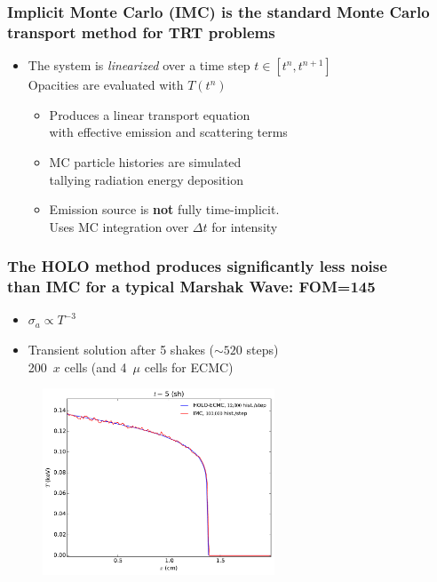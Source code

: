 \documentclass[xcolor=dvipsnames,hyperref={pdfpagelabels=false},unknownkeysallowed]{beamer}
\newcommand{\colb}[1]{{\color{blue} #1}}
\newcommand{\colG}[1]{{\color{Gray!110} #1}}
\newlength{\wideitemsep}
\let\olditem\item
\renewcommand{\item}{\setlength{\itemsep}{\wideitemsep}\olditem}
\begin{document}
\begin{frame}
    \frametitle{Implicit Monte Carlo (IMC) is the standard Monte Carlo transport method for TRT problems}
        \vspace{-0.2in}
\begin{itemize}
    \item[] The system is \emph{linearized} over a time step $t\in[t^n,t^{n+1}]$ \\ 
        \colG{Opacities are evaluated with $T(t^n)$}\vspace{0.21in}
\setlength\wideitemsep{0.2in}
    \begin{itemize}
        \item Produces a linear transport equation
               \\ \colG{with effective emission and scattering terms}
        \item MC particle histories are simulated 
            \\ \colG{tallying radiation energy deposition}
        \item Emission source is \textbf{not} fully time-implicit.\\
            \colG{Uses MC integration over $\Delta t$ for intensity}
    \end{itemize}
\end{itemize}
\end{frame}


\begin{frame}
    \frametitle{The HOLO method produces significantly less noise \\ than IMC for a typical Marshak Wave: \textbf{FOM=145}}
    \centering
        \begin{itemize}
            \item \colb{$\sigma_a\propto T^{-3}$} 
            \item Transient solution after 5 shakes ($\sim 520$ steps) \\ \colG{200~$x$ cells (and 4~$\mu$
                cells for ECMC)}
        \end{itemize}
    \begin{figure}
    \includegraphics[width=0.615799\textwidth]{marshak_200_compare.pdf}
    \end{figure}
\end{frame}
\end{document}
